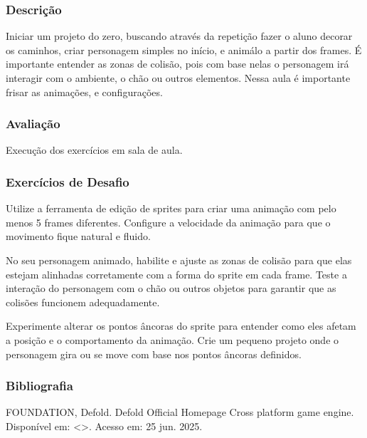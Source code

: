 \documentclass[letterpaper,10pt,brazil]{sphinxmanual}
\begin{document}
\subsubsection*{Descrição}

\sphinxAtStartPar
Iniciar um projeto do zero, buscando através da repetição fazer o aluno decorar os
caminhos, criar personagem simples no início, e animá\sphinxhyphen{}lo a partir dos frames.
É importante entender as zonas de colisão, pois com base nelas o personagem irá interagir
com o ambiente, o chão ou outros elementos.
Nessa aula é importante frisar as animações, e configurações.
\subsubsection*{Avaliação}

\sphinxAtStartPar
Execução dos exercícios em sala de aula.
\subsubsection*{Exercícios de Desafio}

\sphinxAtStartPar
{}
Utilize a ferramenta de edição de sprites para criar uma animação com pelo menos 5 frames diferentes.
Configure a velocidade da animação para que o movimento fique natural e fluido.

\sphinxAtStartPar
{}
No seu personagem animado, habilite e ajuste as zonas de colisão para que elas estejam alinhadas corretamente com a forma do sprite em cada frame.
Teste a interação do personagem com o chão ou outros objetos para garantir que as colisões funcionem adequadamente.

\sphinxAtStartPar
{}
Experimente alterar os pontos âncoras do sprite para entender como eles afetam a posição e o comportamento da animação.
Crie um pequeno projeto onde o personagem gira ou se move com base nos pontos âncoras definidos.

\newpage
\subsubsection*{Bibliografia}

\sphinxAtStartPar
FOUNDATION, Defold. Defold \sphinxhyphen{} Official Homepage \sphinxhyphen{} Cross platform game engine.
Disponível em: \textless{}\textgreater{}. Acesso em: 25 jun. 2025.
\end{document}
